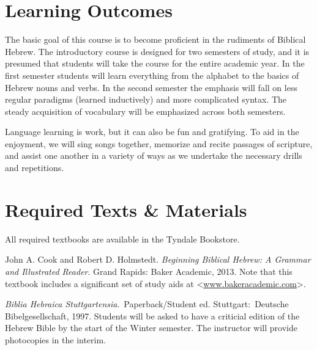 \documentclass[titlepage]{article}
\newcommand\incl{../includes}
\begin{document}


\section{Learning Outcomes}
\label{outcomes}

The basic goal of this course is to become proficient in the rudiments
of Biblical Hebrew. The introductory course is designed for two
semesters of study, and it is presumed that students will take the
course for the entire academic year. In the first semester students will
learn everything from the alphabet to the basics of Hebrew nouns and
verbs. In the second semester the emphasis will fall on less regular
paradigms (learned inductively) and more complicated syntax. The steady
acquisition of vocabulary will be emphasized across both semesters.

Language learning is work, but it can also be fun and gratifying. To
aid in the enjoyment, we will sing songs together, memorize and recite
passages of scripture, and assist one another in a variety of ways as we
undertake the necessary drills and repetitions.

\section{Required Texts \& Materials}
\label{texts}

All required textbooks are available in the Tyndale Bookstore.

\begingroup
\renewcommand{\section}[2]{}%
\begin{thebibliography}{BBH}%

    John A. Cook and Robert D. Holmstedt. \emph{Beginning Biblical Hebrew: A
    Grammar and Illustrated Reader}. Grand Rapids: Baker Academic, 2013. Note
    that this textbook includes a significant set of study aids at
    <\href{http://bakerpublishinggroup.com/books/beginning-biblical-hebrew/342630/esources}{www.bakeracademic.com}>.

    \emph{Biblia Hebraica Stuttgartensia}. Paperback\slash Student ed.
    Stuttgart: Deutsche Bibel\-ge\-sell\-schaft, 1997.  Students will be asked to
    have a criticial edition of the Hebrew Bible by the start of the Winter
    semester. The instructor will provide photocopies in the interim.

\end{thebibliography}
\endgroup
\end{document}
